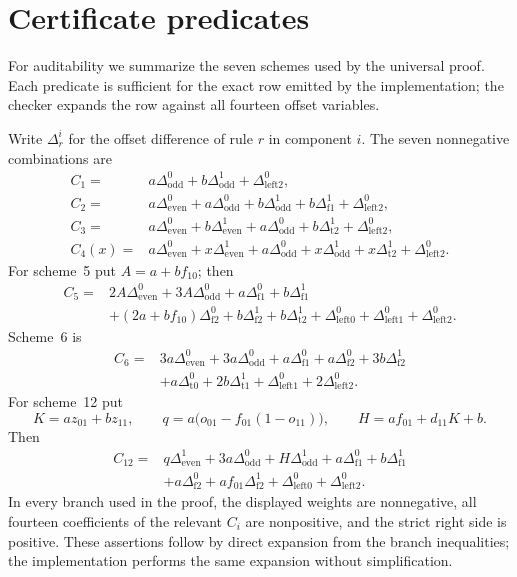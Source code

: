 \documentclass[11pt]{article}
\theoremstyle{definition}
\begin{document}
\appendix
\section{Certificate predicates}\label{app:certs}

For auditability we summarize the seven schemes used by the universal proof.
Each predicate is sufficient for the exact row emitted by the implementation;
the checker expands the row against all fourteen offset variables.

Write $\Delta_r^i$ for the offset difference of rule $r$ in component $i$.
The seven nonnegative combinations are
\begin{align*}
C_1={}&a\Delta_{\mathrm{odd}}^0+b\Delta_{\mathrm{odd}}^1
       +\Delta_{\mathrm{left2}}^0,\\
C_2={}&a\Delta_{\mathrm{even}}^0+a\Delta_{\mathrm{odd}}^0
       +b\Delta_{\mathrm{odd}}^1+b\Delta_{\mathrm{f1}}^1
       +\Delta_{\mathrm{left2}}^0,\\
C_3={}&a\Delta_{\mathrm{even}}^0+b\Delta_{\mathrm{even}}^1
       +a\Delta_{\mathrm{odd}}^0+b\Delta_{\mathrm{t2}}^1
       +\Delta_{\mathrm{left2}}^0,\\
C_4(x)={}&a\Delta_{\mathrm{even}}^0+x\Delta_{\mathrm{even}}^1
       +a\Delta_{\mathrm{odd}}^0+x\Delta_{\mathrm{odd}}^1
       +x\Delta_{\mathrm{t2}}^1+\Delta_{\mathrm{left2}}^0.
\end{align*}
For scheme~5 put $A=a+bf_{10}$; then
\begin{align*}
C_5={}&2A\Delta_{\mathrm{even}}^0+3A\Delta_{\mathrm{odd}}^0
 +a\Delta_{\mathrm{f1}}^0+b\Delta_{\mathrm{f1}}^1\\
& +(2a+bf_{10})\Delta_{\mathrm{f2}}^0
 +b\Delta_{\mathrm{f2}}^1+b\Delta_{\mathrm{t2}}^1
 +\Delta_{\mathrm{left0}}^0+\Delta_{\mathrm{left1}}^0
 +\Delta_{\mathrm{left2}}^0.
\end{align*}
Scheme~6 is
\begin{align*}
C_6={}&3a\Delta_{\mathrm{even}}^0+3a\Delta_{\mathrm{odd}}^0
 +a\Delta_{\mathrm{f1}}^0+a\Delta_{\mathrm{f2}}^0
 +3b\Delta_{\mathrm{f2}}^1\\
&+a\Delta_{\mathrm{t0}}^0+2b\Delta_{\mathrm{t1}}^1
 +\Delta_{\mathrm{left1}}^0+2\Delta_{\mathrm{left2}}^0.
\end{align*}
For scheme~12 put
\[
 K=az_{01}+bz_{11},\qquad
 q=a\bigl(o_{01}-f_{01}(1-o_{11})\bigr),\qquad
 H=af_{01}+d_{11}K+b.
\]
Then
\begin{align*}
C_{12}={}&q\Delta_{\mathrm{even}}^1+3a\Delta_{\mathrm{odd}}^0
 +H\Delta_{\mathrm{odd}}^1+a\Delta_{\mathrm{f1}}^0
 +b\Delta_{\mathrm{f1}}^1\\
&+a\Delta_{\mathrm{f2}}^0+af_{01}\Delta_{\mathrm{f2}}^1
 +\Delta_{\mathrm{left0}}^0+\Delta_{\mathrm{left2}}^0.
\end{align*}
In every branch used in the proof, the displayed weights are nonnegative,
all fourteen coefficients of the relevant $C_i$ are nonpositive, and the
strict right side is positive.  These assertions follow by direct expansion
from the branch inequalities; the implementation performs the same expansion
without simplification.
\end{document}
